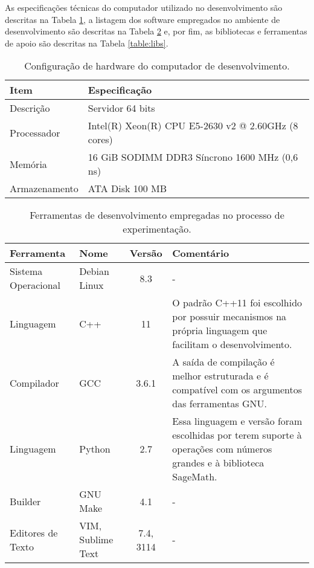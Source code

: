 As especificações técnicas do computador utilizado no desenvolvimento são descritas na Tabela \ref{table:config}, a listagem dos software empregados no ambiente de desenvolvimento são descritas na Tabela \ref{table:tools} e, por fim, as bibliotecas e ferramentas de apoio são descritas na Tabela \ref{table:libs}.

\begin{table}[!ht]
\centering
\begin{tabular}{ll}
\toprule
\textbf{Item}        & \textbf{Especificação}                               \\ \midrule
Descrição            & Servidor 64 bits                                     \\
\rowcolor[gray]{0.9}
Processador          & Intel(R) Xeon(R) CPU E5-2630 v2 @ 2.60GHz (8 cores)  \\
Memória              & 16 GiB SODIMM DDR3 Síncrono 1600 MHz (0,6 ns)        \\
\rowcolor[gray]{0.9}
Armazenamento        & ATA Disk 100 MB                                      \\
\bottomrule
\end{tabular}
\caption{Configuração de hardware do computador de desenvolvimento.}
\label{table:config}
\end{table}

%
%
\begin{table}[!ht]
\centering
    \begin{tabularx}{0.95\textwidth}{llcX}
    \toprule
        \textbf{Ferramenta} & {\textbf{Nome}} & \textbf{Versão} & \textbf{Comentário}  \\
    \midrule
        Sistema Operacional  & Debian Linux      & 8.3       & -                                                            \\
        \rowcolor[gray]{0.9}
        Linguagem            & C++               & 11        & O padrão C++11 foi escolhido por possuir mecanismos na própria linguagem que facilitam o desenvolvimento. \\
        Compilador           & GCC               & 3.6.1     & A saída de compilação é melhor estruturada e é compatível com os argumentos das ferramentas GNU.          \\
        \rowcolor[gray]{0.9}
        Linguagem            & Python            & 2.7       & Essa linguagem e versão foram escolhidas por terem suporte à operações com números grandes e à biblioteca SageMath. \\
        Builder              & GNU Make          & 4.1       & -                                                                                                         \\
        \rowcolor[gray]{0.9}
        Editores de Texto    & VIM, Sublime Text & 7.4, 3114 & -                                                            \\
    \bottomrule

    \end{tabularx}
\caption{Ferramentas de desenvolvimento empregadas no processo de experimentação.}
\label{table:tools}

\end{table}

